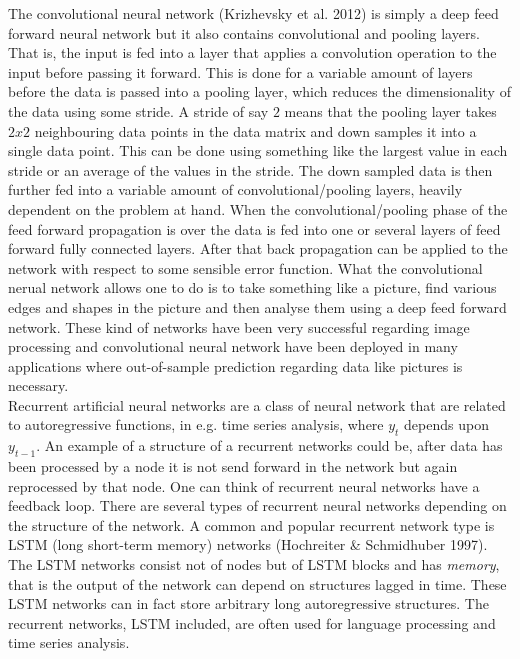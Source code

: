\documentclass[11pt, letterpaper]{amsart}
\begin{document}
The convolutional neural network (Krizhevsky et al. 2012) is simply a deep feed forward neural network but it also contains convolutional and pooling layers. That is, the input is fed into a layer that applies a convolution operation to the input before passing it forward. This is done for a variable amount of layers before the data is passed into a pooling layer, which reduces the dimensionality of the data using some stride. A stride of say $2$ means that the pooling layer takes $2x2$ neighbouring data points in the data matrix and down samples it into a single data point. This can be done using something like the largest value in each stride or an average of the values in the stride. The down sampled data is then further fed into a variable amount of convolutional/pooling layers, heavily dependent on the problem at hand. When the convolutional/pooling phase of the feed forward propagation is over the data is fed into one or several layers of feed forward fully connected layers. After that back propagation can be applied to the network with respect to some sensible error function. What the convolutional nerual network allows one to do is to take something like a picture, find various edges and shapes in the picture and then analyse them using a deep feed forward network. These kind of networks have been very successful regarding image processing and convolutional neural network have been deployed in many applications where out-of-sample prediction regarding data like pictures is necessary.
\\

Recurrent artificial neural networks are a class of neural network that are related to autoregressive functions, in e.g. time series analysis, where $y_t$ depends upon $y_{t-1}$. An example of a structure of a recurrent networks could be, after data has been processed by a node it is not send forward in the network but again reprocessed by that node. One can think of recurrent neural networks have a feedback loop. There are several types of recurrent neural networks depending on the structure of the network. A common and popular recurrent network type is LSTM (long short-term memory) networks (Hochreiter \& Schmidhuber 1997). The LSTM networks consist not of nodes but of LSTM blocks and has \textit{memory}, that is the output of the network can depend on structures lagged in time. These LSTM networks can in fact store arbitrary long autoregressive structures. The recurrent networks, LSTM included, are often used for language processing and time series analysis.
\end{document}
